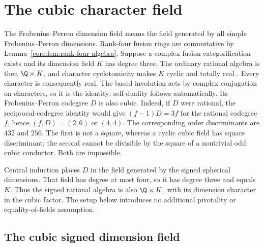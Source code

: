 \section{The cubic character field}\label{sec:cub}

The Frobenius--Perron dimension field means the field generated by
all simple Frobenius--Perron dimensions. Rank-four fusion rings are commutative by
Lemma~\ref{core:lem:rank-four-algebra}. Suppose a complex fusion categorification exists
and its dimension field $K$ has degree three. The ordinary rational algebra is then $\Q\times K$,
and character cyclotomicity makes $K$ cyclic and totally real
\cite[Corollary~8.53]{ENO}. Every character is consequently real.
The based involution acts by complex conjugation on characters, so it
is the identity: self-duality follows automatically.
Its Frobenius--Perron codegree $D$ is also
cubic. Indeed, if $D$ were rational, the reciprocal-codegree identity
would give $(f-1)D=3f$ for the rational codegree $f$, hence
$(f,D)=(2,6)$ or $(4,4)$. The corresponding order discriminants are
$432$ and $256$. The first is not a square, whereas a cyclic cubic
field has square discriminant; the second cannot be divisible by the
square of a nontrivial odd cubic conductor. Both are impossible.

Central induction places $D$ in the field generated by the signed
spherical dimensions. That field has degree at most four, so it has
degree three and equals $K$. Thus the signed rational algebra is also
$\Q\times K$, with its dimension character in the cubic factor.
The setup below introduces no additional pivotality or equality-of-fields
assumption.

\subsection{The cubic signed dimension field}

